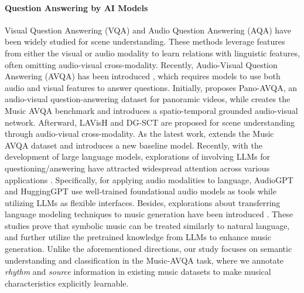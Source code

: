 \paragraph{Question Answering by AI Models}
Visual Question Answering (VQA) \cite{antol2015vqa, lei2018tvqa, yu2019activitynet, garcia2020knowit, ravi2023vlc, yu2024self} and Audio Question Answering (AQA) \cite{fayek2020temporal, lipping2022clotho, sudarsanam2023attention, li2023multi} have been widely studied for scene understanding. These methods leverage features from either the visual or audio modality to learn relations with linguistic features, often omitting audio-visual cross-modality. Recently, Audio-Visual Question Answering (AVQA) has been introduced \cite{yun2021pano, li2022learning}, which requires models to use both audio and visual features to answer questions. Initially, \citet{yun2021pano} proposes Pano-AVQA, an audio-visual question-answering dataset for panoramic videos, while \citet{li2022learning} creates the Music AVQA benchmark and introduces a spatio-temporal grounded audio-visual network. Afterward, LAVisH \cite{lin2023vision} and DG-SCT \cite{duan2024cross} are proposed for scene understanding through audio-visual cross-modality. As the latest work, \citet{liu2024tackling} extends the Music AVQA dataset and introduces a new baseline model. Recently, with the development of large language models, explorations of involving LLMs for questioning/answering have attracted widespread attention across various applications \cite{zhuang2023toolqa, wang2024healthq, saito2024unsupervised}. Specifically, for applying audio modalities to language, AudioGPT \cite{huang2024audiogpt} and HuggingGPT \cite{shen2024hugginggpt} use well-trained foundational audio models as tools while utilizing LLMs as flexible interfaces. Besides, explorations about transferring language modeling techniques to music generation have been introduced \cite{copet2024simple, dai2022missing, agostinelli2023musiclm, lu2023musecoco}. These studies prove that symbolic music can be treated similarly to natural language, and further utilize the pretrained knowledge from LLMs to enhance music generation. Unlike the aforementioned directions, our study focuses on semantic understanding and classification in the Music-AVQA task, where we annotate \textit{rhythm} and \textit{source} information in existing music datasets to make musical characteristics explicitly learnable.